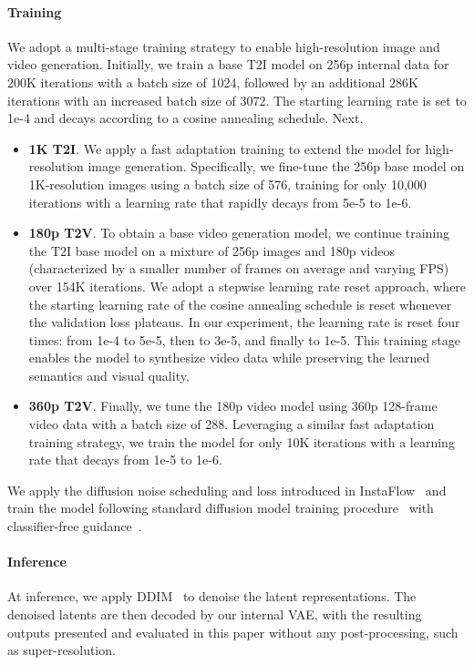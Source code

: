 \paragraph{Training} 
We adopt a multi-stage training strategy to enable high-resolution image and video generation. Initially, we train a base T2I model on 256p internal data for 200K iterations with a batch size of 1024, followed by an additional 286K iterations with an increased batch size of 3072. The starting learning rate is set to 1e-4 and decays according to a cosine annealing schedule. Next,
\begin{itemize}
    \item \textbf{1K T2I}. We apply a fast adaptation training to extend the model for high-resolution image generation. Specifically, we fine-tune the 256p base model on 1K-resolution images using a batch size of 576, training for only 10,000 iterations with a learning rate that rapidly decays from 5e-5 to 1e-6.
    \item \textbf{180p T2V}. To obtain a base video generation model, we continue training the T2I base model on a mixture of 256p images and 180p videos (characterized by a smaller number of frames on average and varying FPS) over 154K iterations. 
    We adopt a stepwise learning rate reset approach, where the starting learning rate of the cosine annealing schedule is reset whenever the validation loss plateaus. In our experiment, the learning rate is reset four times: from 1e-4 to 5e-5, then to 3e-5, and finally to 1e-5.
    This training stage enables the model to synthesize video data while preserving the learned semantics and visual quality. 
    \item \textbf{360p T2V}. Finally, we tune the 180p video model using 360p 128-frame video data with a batch size of 288. Leveraging a similar fast adaptation training strategy, we train the model for only 10K iterations with a learning rate that decays from 1e-5 to 1e-6.
\end{itemize} 
We apply the diffusion noise scheduling and loss introduced in InstaFlow~\citep{liu2023instaflow} and train the model following standard diffusion model training procedure~\citep{ho2020ddpm} with classifier-free guidance~\citep{ho2022classifier}.

\paragraph{Inference} 
At inference, we apply DDIM~\citep{song2020ddim} to denoise the latent representations. The denoised latents are then decoded by our internal VAE, with the resulting outputs presented and evaluated in this paper without any post-processing, such as super-resolution.


